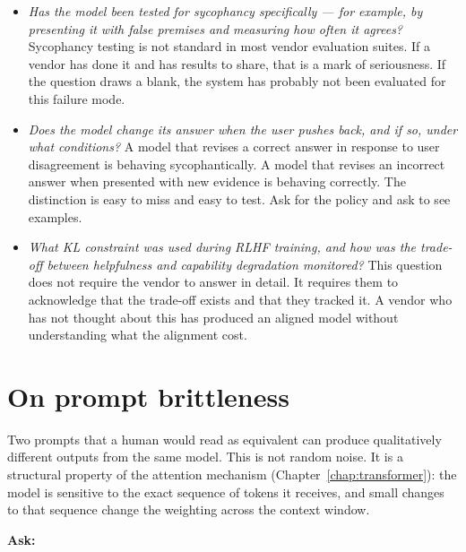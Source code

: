 \begin{itemize}
  \item \emph{Has the model been tested for sycophancy
        specifically --- for example, by presenting it with
        false premises and measuring how often it agrees?}
        Sycophancy testing is not standard in most vendor
        evaluation suites. If a vendor has done it and has
        results to share, that is a mark of seriousness.
        If the question draws a blank, the system has
        probably not been evaluated for this failure mode.

  \item \emph{Does the model change its answer when the
        user pushes back, and if so, under what conditions?}
        A model that revises a correct answer in response
        to user disagreement is behaving sycophantically.
        A model that revises an incorrect answer when
        presented with new evidence is behaving correctly.
        The distinction is easy to miss and easy to test.
        Ask for the policy and ask to see examples.

  \item \emph{What KL constraint was used during RLHF
        training, and how was the trade-off between
        helpfulness and capability degradation monitored?}
        This question does not require the vendor to answer
        in detail. It requires them to acknowledge that
        the trade-off exists and that they tracked it.
        A vendor who has not thought about this has
        produced an aligned model without understanding
        what the alignment cost.
\end{itemize}

\section{On prompt brittleness}

Two prompts that a human would read as equivalent can
produce qualitatively different outputs from the same model.
This is not random noise. It is a structural property of
the attention mechanism (Chapter~\ref{chap:transformer}): the model is sensitive
to the exact sequence of tokens it receives, and small
changes to that sequence change the weighting across the
context window.

\medskip
\noindent\textbf{Ask:}

